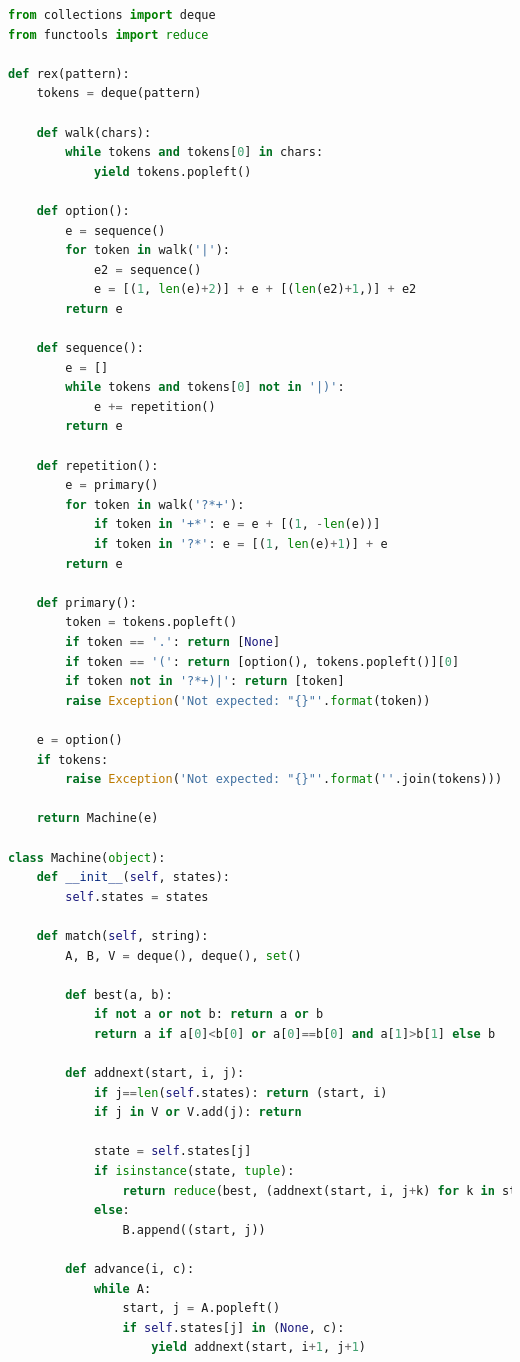 \documentclass[a4paper,12pt,oneside,onecolumn]{uerj}
\begin{document}
\begin{lstlisting}[language=python]
from collections import deque
from functools import reduce

def rex(pattern):
    tokens = deque(pattern)

    def walk(chars):
        while tokens and tokens[0] in chars:
            yield tokens.popleft()

    def option():
        e = sequence()
        for token in walk('|'):
            e2 = sequence()
            e = [(1, len(e)+2)] + e + [(len(e2)+1,)] + e2
        return e        

    def sequence():
        e = []
        while tokens and tokens[0] not in '|)':
            e += repetition()
        return e
        
    def repetition():
        e = primary()
        for token in walk('?*+'):
            if token in '+*': e = e + [(1, -len(e))]
            if token in '?*': e = [(1, len(e)+1)] + e
        return e
        
    def primary():
        token = tokens.popleft()
        if token == '.': return [None]
        if token == '(': return [option(), tokens.popleft()][0]
        if token not in '?*+)|': return [token]
        raise Exception('Not expected: "{}"'.format(token))

    e = option()
    if tokens: 
        raise Exception('Not expected: "{}"'.format(''.join(tokens)))

    return Machine(e)
                
class Machine(object):
    def __init__(self, states):
        self.states = states
        
    def match(self, string):
        A, B, V = deque(), deque(), set()
             
        def best(a, b):
            if not a or not b: return a or b
            return a if a[0]<b[0] or a[0]==b[0] and a[1]>b[1] else b
                
        def addnext(start, i, j):
            if j==len(self.states): return (start, i)
            if j in V or V.add(j): return

            state = self.states[j]
            if isinstance(state, tuple):
                return reduce(best, (addnext(start, i, j+k) for k in state))
            else:
                B.append((start, j))
        
        def advance(i, c):
            while A:
                start, j = A.popleft()
                if self.states[j] in (None, c):
                    yield addnext(start, i+1, j+1)
        

\end{lstlisting}
\end{document}
